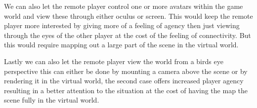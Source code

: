 		We can also let the remote player control one or more avatars within the game world
		and view these through either oculus or screen. This would keep the remote player
		more interested by giving more of a feeling of agency then just viewing through the eyes 
		of the other player at the cost of the feeling of connectivity. But this would require 
		mapping out a large part of the scene in the virtual world. 
		
		Lastly we can also let the remote player view the world from a birds eye perspective 
		this can either be done by mounting a camera above the scene or by rendering it in 
		the virtual world, the second case offers increased player agency resulting in 
		a better attention to the situation at the cost of having the map the scene fully 
		in the virtual world. 
		
